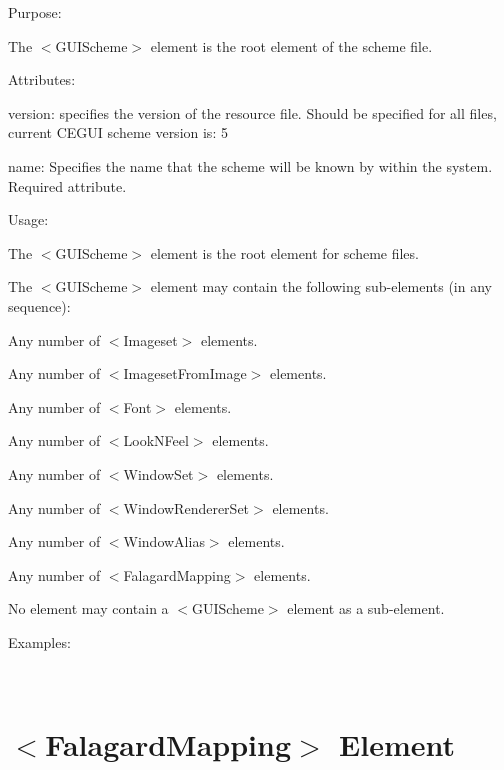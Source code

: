 \begin{DoxyItemize}
\item Purpose\+:
\begin{DoxyItemize}
\item The $<$G\+U\+I\+Scheme$>$ element is the root element of the scheme file.
\end{DoxyItemize}
\item Attributes\+:
\begin{DoxyItemize}
\item {\ttfamily version\+:} specifies the version of the resource file. Should be specified for all files, current C\+E\+G\+UI scheme version is\+: 5
\item {\ttfamily name\+:} Specifies the name that the scheme will be known by within the system. Required attribute.
\end{DoxyItemize}
\item Usage\+:
\begin{DoxyItemize}
\item The $<$G\+U\+I\+Scheme$>$ element is the root element for scheme files.
\item The $<$G\+U\+I\+Scheme$>$ element may contain the following sub-\/elements (in any sequence)\+:
\begin{DoxyItemize}
\item Any number of $<$Imageset$>$ elements.
\item Any number of $<$Imageset\+From\+Image$>$ elements.
\item Any number of $<$Font$>$ elements.
\item Any number of $<$Look\+N\+Feel$>$ elements.
\item Any number of $<$Window\+Set$>$ elements.
\item Any number of $<$Window\+Renderer\+Set$>$ elements.
\item Any number of $<$Window\+Alias$>$ elements.
\item Any number of $<$Falagard\+Mapping$>$ elements.
\end{DoxyItemize}
\item No element may contain a $<$G\+U\+I\+Scheme$>$ element as a sub-\/element.
\end{DoxyItemize}
\item Examples\+:
\end{DoxyItemize}

~\newline
 \hypertarget{xml_scheme_xml_scheme_falagardmapping}{}\section{$<$\+Falagard\+Mapping$>$ Element}\label{xml_scheme_xml_scheme_falagardmapping}

